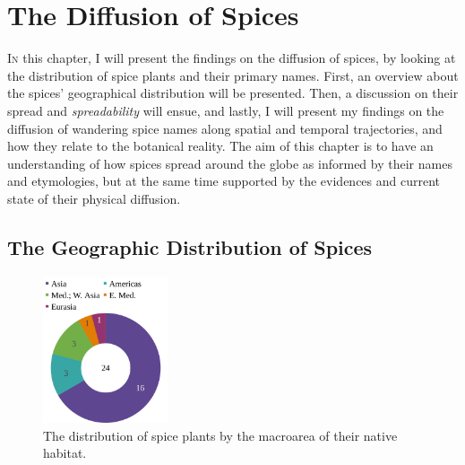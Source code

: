 \chapter{The Diffusion of Spices}
\label{ch:diffusion}





\lettrine[lines=\iniciale]{\textcolor{\accentcolor}{I}}{n} this chapter, I will present the findings on the diffusion of spices, by looking at the distribution of spice plants and their primary names. First, an overview about the spices' geographical distribution will be presented. Then, a discussion on their spread and \textit{spreadability} will ensue, and lastly, I will present my findings on the diffusion of wandering spice names along spatial and temporal trajectories, and how they relate to the botanical reality. The aim of this chapter is to have an understanding of how spices spread around the globe as informed by their names and etymologies, but at the same time supported by the evidences and current state of their physical diffusion.

\section{The Geographic Distribution of Spices}

\begin{figure}
    \vspace{-\baselineskip}
    \includegraphics[width=0.33\textwidth]{imgs/plots/macroarea_pie.pdf}
    \caption{The distribution of spice plants by the macroarea of their native habitat.}
    \label{fig:macroarea_pie}
  \end{figure}
  
